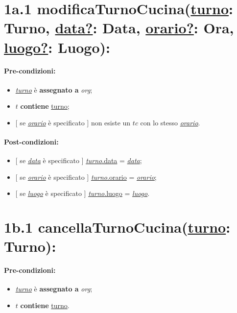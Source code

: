 \section*{1a.1 modificaTurnoCucina(\underline{turno}: Turno, \underline{data?}: Data, \underline{orario?}: Ora, \underline{luogo?}: Luogo):}

\paragraph{Pre-condizioni:}

\begin{itemize}
 \item \underline{\textit{turno}} è \textbf{assegnato a} {\textit{org}};
 \item $t$ \textbf{contiene} \underline{turno};
 \item $[$ se \underline{\textit{orario}} è specificato $]$ non esiste un $tc$ con lo stesso \underline{\textit{orario}}.
\end{itemize}

\paragraph{Post-condizioni:}

\begin{itemize}
    \item $[$ se \underline{\textit{data}} è specificato $]$ \underline{\textit{turno}.data} = \underline{\textit{data}};

    \item $[$ se \underline{\textit{orario}} è specificato $]$ \underline{\textit{turno}.orario} = \underline{\textit{orario}};

    \item $[$ se \underline{\textit{luogo}} è specificato $]$ \underline{\textit{turno}.luogo} = \underline{\textit{luogo}}.

\end{itemize}

\section*{1b.1 cancellaTurnoCucina(\underline{turno}: Turno):}

\paragraph{Pre-condizioni:}

\begin{itemize}
 \item \underline{\textit{turno}} è \textbf{assegnato a} {\textit{org}};
 \item $t$ \textbf{contiene} \underline{turno}.
\end{itemize}

